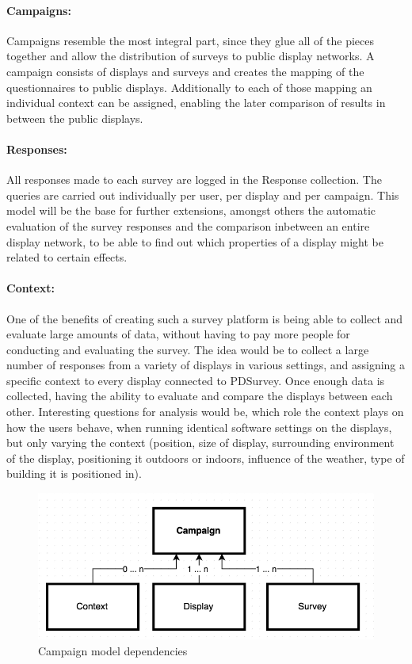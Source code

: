 \paragraph{Campaigns:} Campaigns resemble the most integral part, since they glue all of the pieces together and allow the distribution of surveys to public display networks. A campaign consists of displays and surveys and creates the mapping of the questionnaires to public displays. Additionally to each of those mapping an individual context can be assigned, enabling the later comparison of results in between the public displays.

\paragraph{Responses:} All responses made to each survey are logged in the Response collection. The queries are carried out individually per user, per display and per campaign. This model will be the base for further extensions, amongst others the automatic evaluation of the survey responses and the comparison inbetween an entire display network, to be able to find out which properties of a display might be related to certain effects.

\paragraph{Context:} One of the benefits of creating such a survey platform is being able to collect and evaluate large amounts of data, without having to pay more people for conducting and evaluating the survey. The idea would be to collect a large number of responses from a variety of displays in various settings, and assigning a specific context to every display connected to PDSurvey. Once enough data is collected, having the ability to evaluate and compare the displays between each other. Interesting questions for analysis would be, which role the context plays on how the users behave, when running identical software settings on the displays, but only varying the context (position, size of display, surrounding environment of the display, positioning it outdoors or indoors, influence of the weather, type of building it is positioned in).


\begin{figure}%
    \begin{center}
        \includegraphics[width=.8\columnwidth]{img/4_implementation/4-dependency-campaign}
    \end{center}
 \caption{Campaign model dependencies}
 \label{fig:4-dependency-campaign}
\end{figure}


